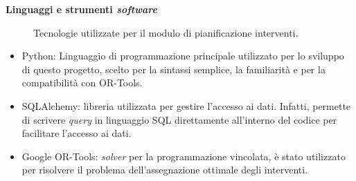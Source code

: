 \textbf{Linguaggi e strumenti \textit{software}}

\begin{figure}[H]
\centering
{}
\caption{Tecnologie utilizzate per il modulo di pianificazione interventi.}
\label{fig:Ag}
\end{figure}
\begin{itemize}
    \item Python: Linguaggio di programmazione principale utilizzato per lo sviluppo di questo progetto, scelto per la sintassi semplice, la familiarità e per la compatibilità con OR-Tools.
    \item SQLAlchemy: libreria  utilizzata per gestire l'accesso ai dati. Infatti, permette di scrivere \textit{query} in linguaggio SQL direttamente all'interno del codice per facilitare l'accesso ai dati.
    \item Google OR-Tools: \textit{solver} per la programmazione vincolata, è stato utilizzato per risolvere il problema dell'assegnazione ottimale degli interventi.
\end{itemize}

